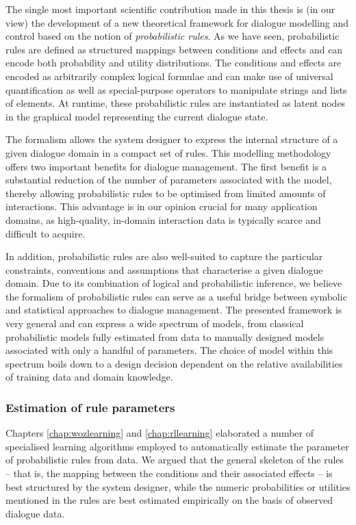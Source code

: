 The single most important scientific contribution made in this thesis is (in our view) the development of a new theoretical framework for dialogue modelling and control based on the notion of \textit{probabilistic rules}.  As we have seen, probabilistic rules are defined as structured mappings between conditions and effects and can encode both probability and utility distributions.  The conditions and effects are encoded as arbitrarily complex logical formulae and can make use of universal quantification as well as special-purpose operators to manipulate strings and lists of elements. At runtime, these probabilistic rules are instantiated as latent nodes in the graphical model representing the current dialogue state.  

The formalism allows the system designer to express the internal structure of a given dialogue domain in a compact set of rules. This modelling methodology offers two important benefits for dialogue management.  The first benefit is a substantial reduction of the number of parameters associated with the model, thereby allowing probabilistic rules to be optimised from limited amounts of interactions. This advantage is in our opinion crucial for many application domains, as high-quality, in-domain interaction data is typically scarce and difficult to acquire.

In addition, probabilistic rules are also well-suited to capture the particular constraints, conventions and assumptions that characterise a given dialogue domain.  Due to its combination of logical and probabilistic inference, we believe the formalism of probabilistic rules can serve as a useful bridge between symbolic and statistical approaches to dialogue management.  The presented framework is very general and can express a wide spectrum of models, from classical probabilistic models fully estimated from data to manually designed models associated with only a handful of parameters. The choice of model within this spectrum boils down to a design decision dependent on the relative availabilities of training data and domain knowledge.


\subsubsection*{Estimation of rule parameters}
Chapters \ref{chap:wozlearning} and \ref{chap:rllearning} elaborated a number of specialised learning algorithms employed to automatically estimate the parameter of probabilistic rules from data. We argued that the general skeleton of the rules -- that is, the mapping between the conditions and their associated effects -- is best structured by the system designer, while the numeric probabilities or utilities mentioned in the rules are best estimated empirically on the basis of observed dialogue data. 

